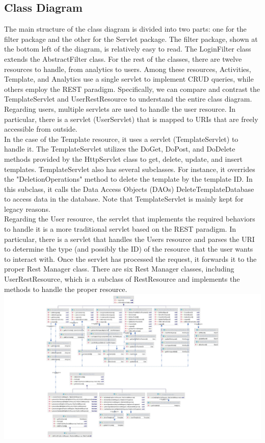 \subsection{Class Diagram}


The main structure of the class diagram is divided into two parts: one for the filter package and the other for the Servlet package. The filter package, shown at the bottom left of the diagram, is relatively easy to read. The LoginFilter class extends the AbstractFilter class. For the rest of the classes, there are twelve resources to handle, from analytics to users. Among these resources, Activities, Template, and Analytics use a single servlet to implement CRUD queries, while others employ the REST paradigm. Specifically, we can compare and contrast the TemplateServlet and UserRestResource to understand the entire class diagram.\\

Regarding users, multiple servlets are used to handle the user resource. In particular, there is a servlet (UserServlet) that is mapped to URIs that are freely accessible from outside.\\

In the case of the Template resource, it uses a servlet (TemplateServlet) to handle it. The TemplateServlet utilizes the DoGet, DoPost, and DoDelete methods provided by the HttpServlet class to get, delete, update, and insert templates. TemplateServlet also has several subclasses. For instance, it overrides the "DeletionOperations" method to delete the template by the template ID. In this subclass, it calls the Data Access Objects (DAOs) DeleteTemplateDatabase to access data in the database. Note that TemplateServlet is mainly kept for legacy reasons.\\

Regarding the User resource, the servlet that implements the required behaviors to handle it is a more traditional servlet based on the REST paradigm. In particular, there is a servlet that handles the Users resource and parses the URI to determine the type (and possibly the ID) of the resource that the user wants to interact with. Once the servlet has processed the request, it forwards it to the proper Rest Manager class. There are six Rest Manager classes, including UserRestResource, which is a subclass of RestResource and implements the methods to handle the proper resource.\\
\includegraphics[width=1.30\columnwidth]{images/class sequence.jpg}\\

